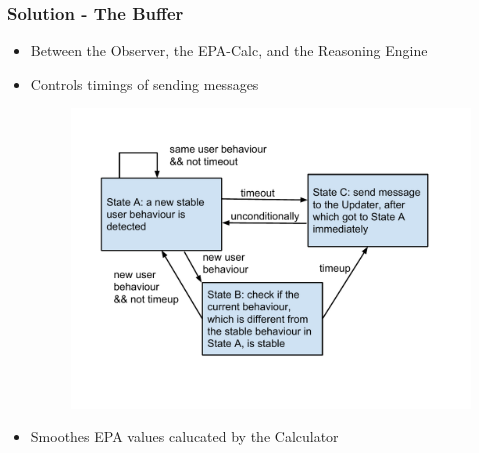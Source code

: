 \documentclass{beamer}
\begin{document}
\begin{frame}
\frametitle{Solution - The Buffer}
\begin{itemize}
\item Between the Observer, the EPA-Calc, and the Reasoning Engine
\item Controls timings of sending messages
\begin{figure}
\centering
\includegraphics[trim = 10mm 25mm 16mm 15mm, clip, width=0.75\linewidth]{fig/fig-state-trans.pdf}
\end{figure}
\item Smoothes EPA values calucated by the Calculator
\end{itemize}
\end{frame}
\end{document}

